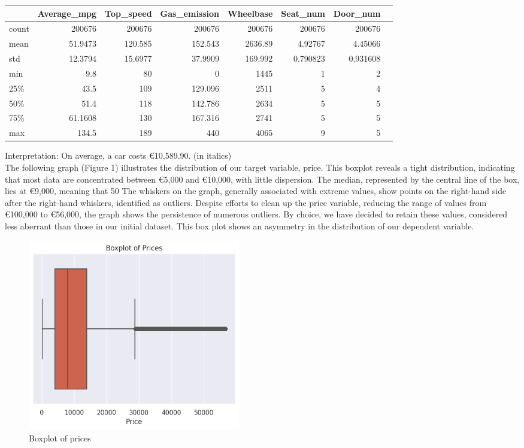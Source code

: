 \documentclass[12pt]{article}
\begin{document}
\begin{table}[h]
    \centering
    \begin{tabular}{lrrrrrrr}
    \toprule
           & Average\_mpg & Top\_speed & Gas\_emission & Wheelbase & Seat\_num & Door\_num \\
    \midrule
     count & 200676 & 200676 & 200676 & 200676 & 200676 & 200676 \\
     mean & 51.9473 & 120.585 & 152.543 & 2636.89 & 4.92767 & 4.45066 \\
     std & 12.3794 & 15.6977 & 37.9909 & 169.992 & 0.790823 & 0.931608 \\
     min & 9.8 & 80 & 0 & 1445 & 1 & 2 \\
     25\% & 43.5 & 109 & 129.096 & 2511 & 5 & 4 \\
     50\% & 51.4 & 118 & 142.786 & 2634 & 5 & 5 \\
     75\% & 61.1608 & 130 & 167.316 & 2741 & 5 & 5 \\
     max & 134.5 & 189 & 440 & 4065 & 9 & 5 \\
    \bottomrule
    \end{tabular}
\end{table}

\FloatBarrier

\noindent Interpretation: On average, a car costs €10,589.90. (in italics) \\

\noindent The following graph (Figure 1) illustrates the distribution of our target variable, price. This boxplot reveals a tight distribution, indicating that most data are concentrated between €5,000 and €10,000, with little dispersion. The median, represented by the central line of the box, lies at €9,000, meaning that 50 %
\noindent The whiskers on the graph, generally associated with extreme values, show points on the right-hand side after the right-hand whiskers, identified as outliers. Despite efforts to clean up the price variable, reducing the range of values from €100,000 to €56,000, the graph shows the persistence of numerous outliers. By choice, we have decided to retain these values, considered less aberrant than those in our initial dataset.
\noindent This box plot shows an asymmetry in the distribution of our dependent variable.

\FloatBarrier
\begin{figure}[ht]
    \centering
    \includegraphics[width=0.45\textwidth]{boxplot price.png}
    \caption{Boxplot of prices}
    \label{fig:boxplot}
\end{figure}
\FloatBarrier
\end{document}
